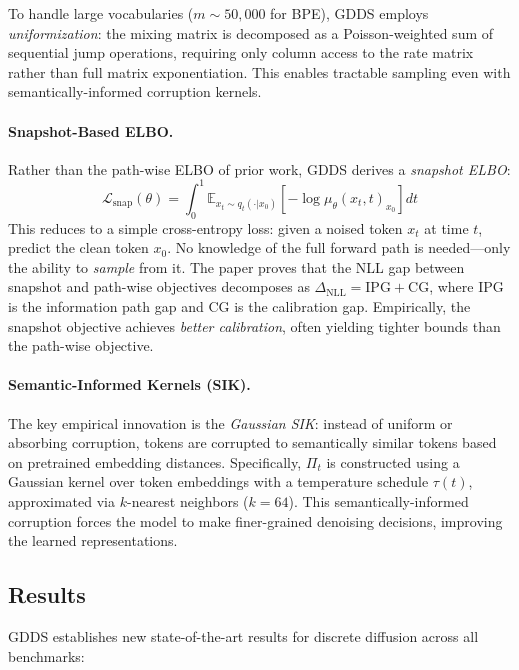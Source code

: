 \documentclass[11pt]{article}
\begin{document}
To handle large vocabularies ($m \sim 50{,}000$ for BPE), GDDS employs \textit{uniformization}: the mixing matrix is decomposed as a Poisson-weighted sum of sequential jump operations, requiring only column access to the rate matrix rather than full matrix exponentiation. This enables tractable sampling even with semantically-informed corruption kernels.

\paragraph{Snapshot-Based ELBO.}
Rather than the path-wise ELBO of prior work, GDDS derives a \textit{snapshot ELBO}:
\begin{equation}
\mathcal{L}_{\mathrm{snap}}(\theta) = \int_0^1 \mathbb{E}_{x_t \sim q_t(\cdot | x_0)} \left[ -\log \mu_\theta(x_t, t)_{x_0} \right] dt
\end{equation}
This reduces to a simple cross-entropy loss: given a noised token $x_t$ at time $t$, predict the clean token $x_0$. No knowledge of the full forward path is needed---only the ability to \textit{sample} from it. The paper proves that the NLL gap between snapshot and path-wise objectives decomposes as $\Delta_{\mathrm{NLL}} = \mathrm{IPG} + \mathrm{CG}$, where IPG is the information path gap and CG is the calibration gap. Empirically, the snapshot objective achieves \textit{better calibration}, often yielding tighter bounds than the path-wise objective.

\paragraph{Semantic-Informed Kernels (SIK).}
The key empirical innovation is the \textit{Gaussian SIK}: instead of uniform or absorbing corruption, tokens are corrupted to semantically similar tokens based on pretrained embedding distances. Specifically, $\Pi_t$ is constructed using a Gaussian kernel over token embeddings with a temperature schedule $\tau(t)$, approximated via $k$-nearest neighbors ($k=64$). This semantically-informed corruption forces the model to make finer-grained denoising decisions, improving the learned representations.

\subsection{Results}

GDDS establishes new state-of-the-art results for discrete diffusion across all benchmarks:
\end{document}
